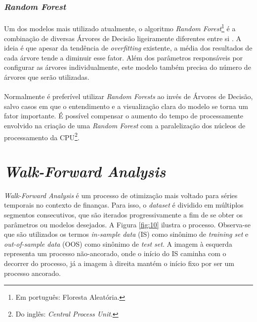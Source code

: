 \FloatBarrier
\subsubsection*{\textit{Random Forest}}

\paragraph{} Um dos modelos mais utilizado atualmente, o algoritmo \textit{Random Forest}\footnote{Em português: Floresta Aleatória.} é a combinação de diversas Árvores de Decisão ligeiramente diferentes entre si \cite{muller2016introduction}. A ideia é que apesar da tendência de \textit{overfitting} existente, a média dos resultados de cada árvore tende a diminuir esse fator. Além dos parâmetros responsáveis por configurar as árvores individualmente, este modelo também precisa do número de árvores que serão utilizadas.

\paragraph{} Normalmente é preferível utilizar \textit{Random Forests} ao invés de Árvores de Decisão, salvo casos em que o entendimento e a visualização clara do modelo se torna um fator importante. É possível compensar o aumento do tempo de processamente envolvido na criação de uma \textit{Random Forest} com a paralelização dos núcleos de processamento da CPU\footnote{Do inglês: \textit{Central Process Unit}.}.



\FloatBarrier
\section{\textit{Walk-Forward Analysis}}

\paragraph{} \textit{Walk-Forward Analysis} \cite{pardo2011evaluation} é um processo de otimização mais voltado para séries temporais no contexto de finanças. Para isso, o \textit{dataset} é dividido em múltiplos segmentos consecutivos, que são iterados progressivamente a fim de se obter os parâmetros ou modelos desejados. A Figura \ref{fig:10} ilustra o processo. Observa-se que são utilizados os termos \textit{in-sample data} (IS) como sinônimo de \textit{training set} e \textit{out-of-sample data} (OOS) como sinônimo de \textit{test set}. A imagem à esquerda representa um processo não-ancorado, onde o início do IS caminha com o decorrer do processo, já a imagem à direita mantém o início fixo por ser um processo ancorado.

